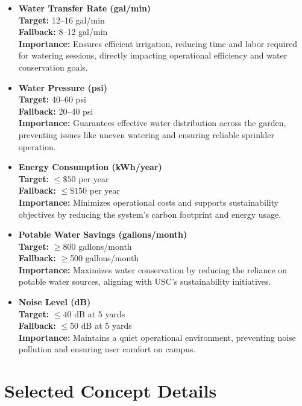 \documentclass[12pt]{article}
\begin{document}
\begin{itemize}
    \item \textbf{Water Transfer Rate (gal/min)}\\
    \textbf{Target:} 12--16 gal/min \\
    \textbf{Fallback:} 8--12 gal/min \\
    \textbf{Importance:} Ensures efficient irrigation, reducing time and labor required for watering sessions, directly impacting operational efficiency and water conservation goals.

    \item \textbf{Water Pressure (psi)}\\
    \textbf{Target:} 40--60 psi \\
    \textbf{Fallback:} 20--40 psi \\
    \textbf{Importance:} Guarantees effective water distribution across the garden, preventing issues like uneven watering and ensuring reliable sprinkler operation.

    \item \textbf{Energy Consumption (kWh/year)}\\
    \textbf{Target:} $\leq\$50$ per year \\
    \textbf{Fallback:} $\leq\$150$ per year \\
    \textbf{Importance:} Minimizes operational costs and supports sustainability objectives by reducing the system's carbon footprint and energy usage.

    \item \textbf{Potable Water Savings (gallons/month)}\\
    \textbf{Target:} $\geq$800 gallons/month \\
    \textbf{Fallback:} $\geq$500 gallons/month \\
    \textbf{Importance:} Maximizes water conservation by reducing the reliance on potable water sources, aligning with USC's sustainability initiatives.

    \item \textbf{Noise Level (dB)}\\
    \textbf{Target:} $\leq$40 dB at 5 yards \\
    \textbf{Fallback:} $\leq$50 dB at 5 yards \\
    \textbf{Importance:} Maintains a quiet operational environment, preventing noise pollution and ensuring user comfort on campus.
\end{itemize}

\newpage
\section{Selected Concept Details}
\end{document}
